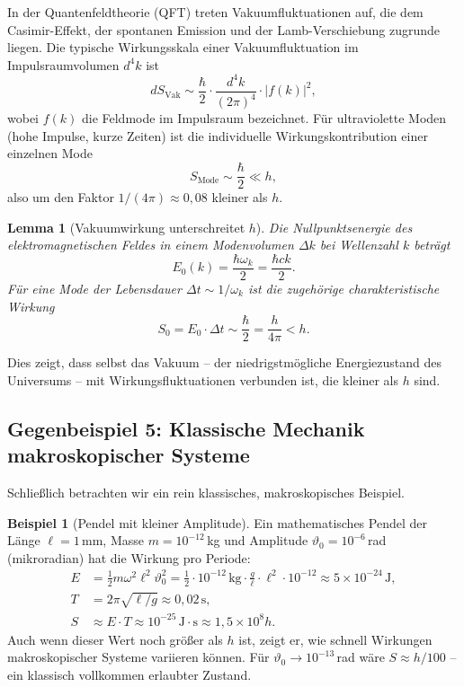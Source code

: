 ﻿\documentclass[12pt,a4paper]{article}
\theoremstyle{plain}
\newtheorem{lemma}{Lemma}[section]
\theoremstyle{definition}
\newtheorem{example}{Beispiel}[section]
\theoremstyle{remark}
\begin{document}
In der Quantenfeldtheorie (QFT) treten Vakuumfluktuationen auf, die dem Casimir-Effekt,
der spontanen Emission und der Lamb-Verschiebung zugrunde liegen. Die typische Wirkungsskala
einer Vakuumfluktuation im Impulsraumvolumen $d^4k$ ist
\begin{equation}
  dS_{\mathrm{Vak}} \sim \frac{\hbar}{2} \cdot \frac{d^4k}{(2\pi)^4} \cdot |f(k)|^2,
\end{equation}
wobei $f(k)$ die Feldmode im Impulsraum bezeichnet. Für ultraviolette Moden (hohe
Impulse, kurze Zeiten) ist die individuelle Wirkungskontribution einer einzelnen Mode
\begin{equation}
  S_{\mathrm{Mode}} \sim \frac{\hbar}{2} \ll h,
\end{equation}
also um den Faktor $1/(4\pi) \approx 0{,}08$ kleiner als $h$.

\begin{lemma}[Vakuumwirkung unterschreitet $h$]\label{lem:vakuum}
  Die Nullpunktsenergie des elektromagnetischen Feldes in einem Modenvolumen $\Delta k$
  bei Wellenzahl $k$ beträgt
  \begin{equation}
    E_0(k) = \frac{\hbar\omega_k}{2} = \frac{\hbar c k}{2}.
  \end{equation}
  Für eine Mode der Lebensdauer $\Delta t \sim 1/\omega_k$ ist die zugehörige
  charakteristische Wirkung
  \begin{equation}
    S_0 = E_0 \cdot \Delta t \sim \frac{\hbar}{2} = \frac{h}{4\pi} < h.
  \end{equation}
\end{lemma}

Dies zeigt, dass selbst das Vakuum -- der niedrigstmögliche Energiezustand des
Universums -- mit Wirkungsfluktuationen verbunden ist, die kleiner als $h$ sind.

\subsection{Gegenbeispiel 5: Klassische Mechanik makroskopischer Systeme}

Schließlich betrachten wir ein rein klassisches, makroskopisches Beispiel.

\begin{example}[Pendel mit kleiner Amplitude]\label{ex:pendel}
  Ein mathematisches Pendel der Länge $\ell = 1$\,mm, Masse $m = 10^{-12}$\,kg und
  Amplitude $\vartheta_0 = 10^{-6}$\,rad (mikroradian) hat die Wirkung pro Periode:
  \begin{align}
    E &= \frac{1}{2}m\omega^2 \ell^2 \vartheta_0^2
       = \frac{1}{2}\cdot 10^{-12}\,\text{kg}\cdot \frac{g}{\ell}\cdot \ell^2\cdot 10^{-12}
       \approx 5\times 10^{-24}\,\text{J},\\
    T &= 2\pi\sqrt{\ell/g} \approx 0{,}02\,\text{s},\\
    S &\approx E \cdot T \approx 10^{-25}\,\mathrm{J{\cdot}s} \approx 1{,}5\times 10^{8} h.
  \end{align}
  Auch wenn dieser Wert noch größer als $h$ ist, zeigt er, wie schnell Wirkungen
  makroskopischer Systeme variieren können. Für $\vartheta_0 \to 10^{-13}$\,rad wäre
  $S \approx h/100$ -- ein klassisch vollkommen erlaubter Zustand.
\end{example}
\end{document}
